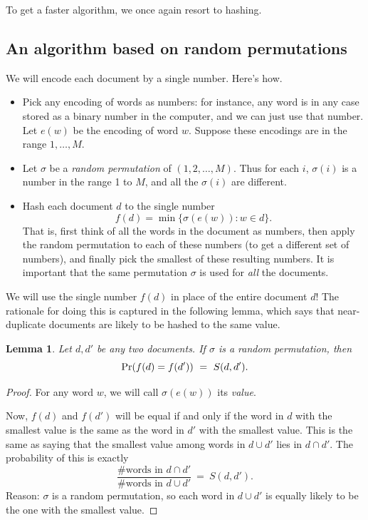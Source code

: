 \documentclass{report}
\theoremstyle{plain}
\newtheorem{lemma}{Lemma}
\theoremstyle{definition}
\newcommand{\pr}{\mbox{\rm Pr}}
\begin{document}
To get a faster algorithm, we once again resort to hashing.

\subsection{An algorithm based on random permutations}

We will encode each document by a single number. Here's how.
\begin{itemize}
\item Pick any encoding of words as numbers: for instance, any word is in any case stored
as a binary number in the computer, and we can just use that number. Let $e(w)$ be the encoding
of word $w$. Suppose these encodings are in the range $1,\ldots, M$.
\item Let $\sigma$ be a {\it random permutation} of $(1,2,\ldots, M)$. Thus for each $i$, 
$\sigma(i)$ is a number in the range 1 to $M$, and all the $\sigma(i)$ are different.
\item Hash each document $d$ to the single number
$$ f(d) = \min \{\sigma(e(w)): w \in d\} .$$
That is, first think of all the words in the document as numbers, then apply the random 
permutation to each of these numbers (to get a different set of numbers), and finally pick
the smallest of these resulting numbers. It is important that the same permutation $\sigma$
is used for {\it all} the documents.
\end{itemize}

We will use the single number $f(d)$ in place of the entire document $d$! The rationale for doing 
this is captured in the following lemma, which says that near-duplicate documents are likely to
be hashed to the same value.
\begin{lemma}
Let $d,d'$ be any two documents. If $\sigma$ is a random permutation, then
$$ \pr(f(d) = f(d')) \ = \ S(d,d') .$$
\end{lemma}
\begin{proof}
For any word $w$, we will call $\sigma(e(w))$ its {\it value}.

Now, $f(d)$ and $f(d')$ will be equal if and only if the word in $d$ with the
smallest value is the same as the word in $d'$ with the smallest value. This is the same 
as saying that the smallest value among words in $d \cup d'$ lies in $d \cap d'$. The 
probability of this is exactly
$$ \frac{\mbox{\# words in $d \cap d'$}}{\mbox{\# words in $d \cup d'$}} \ = \ S(d,d').$$
Reason: $\sigma$ is a random permutation, so each word in $d \cup d'$ is equally likely to 
be the one with the smallest value.
\end{proof}
\end{document}
